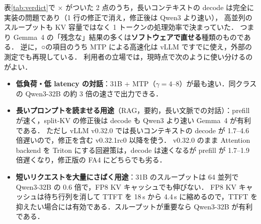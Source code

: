 表\ref{tab:verdict}で × がついた 2 点のうち，長いコンテキストの decode は完全に実装の問題であり（1 行の修正で消え，修正後は Qwen3 より速い），
高並列のスループットも KV 容量ではなく 1 トークンの処理効率で決まっていた．
つまり Gemma~4 の「残念な」結果の多くは\textbf{ソフトウェアで直せる}種類のものである．
逆に，○の項目のうち MTP による高速化は vLLM ですでに使え，外部の測定でも再現している．
利用者の立場では，現時点で次のように使い分けるのがよい．
\begin{itemize}
\item \textbf{低負荷・低 latency の対話}：31B + MTP（$\gamma=4$--8）が最も速い．同クラスの Qwen3-32B の約 3 倍の速さで出力できる．
\item \textbf{長いプロンプトを読ませる用途}（RAG，要約，長い文脈での対話）：prefill が速く，split-KV の修正後は decode も Qwen3 より速い Gemma~4 が有利である．
      ただし vLLM v0.32.0 では長いコンテキストの decode が 1.7--4.6 倍遅いので，修正を含む v0.32.1rc0 以降を使う．
      v0.32.0 のまま Attention backend を Triton にする回避策は，decode は速くなるが prefill が 1.7--1.9 倍遅くなり，修正版の FA4 にどちらでも劣る．
\item \textbf{短いリクエストを大量にさばく用途}：31B のスループットは 64 並列で Qwen3-32B の 0.6 倍で，FP8 KV キャッシュでも伸びない．
      FP8 KV キャッシュは待ち行列を消して TTFT を 18\,s から 4.4\,s に縮めるので，TTFT を抑えたい場合には有効である．スループットが重要なら Qwen3-32B が有利である．
\end{itemize}

